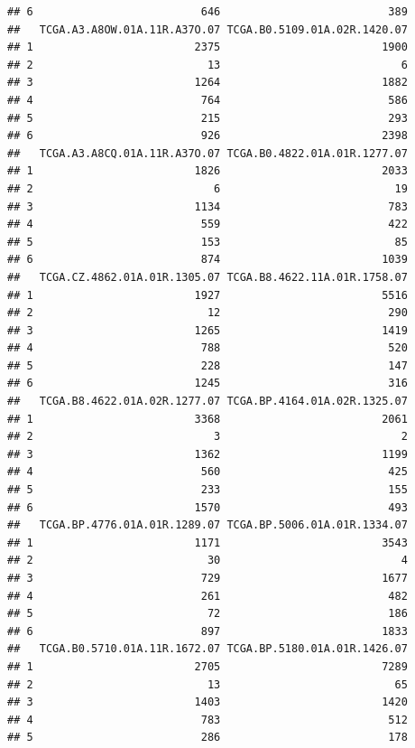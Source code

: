 \documentclass[
]{article}
\begin{document}
\begin{verbatim}
## 6                          646                          389
##   TCGA.A3.A8OW.01A.11R.A37O.07 TCGA.B0.5109.01A.02R.1420.07
## 1                         2375                         1900
## 2                           13                            6
## 3                         1264                         1882
## 4                          764                          586
## 5                          215                          293
## 6                          926                         2398
##   TCGA.A3.A8CQ.01A.11R.A37O.07 TCGA.B0.4822.01A.01R.1277.07
## 1                         1826                         2033
## 2                            6                           19
## 3                         1134                          783
## 4                          559                          422
## 5                          153                           85
## 6                          874                         1039
##   TCGA.CZ.4862.01A.01R.1305.07 TCGA.B8.4622.11A.01R.1758.07
## 1                         1927                         5516
## 2                           12                          290
## 3                         1265                         1419
## 4                          788                          520
## 5                          228                          147
## 6                         1245                          316
##   TCGA.B8.4622.01A.02R.1277.07 TCGA.BP.4164.01A.02R.1325.07
## 1                         3368                         2061
## 2                            3                            2
## 3                         1362                         1199
## 4                          560                          425
## 5                          233                          155
## 6                         1570                          493
##   TCGA.BP.4776.01A.01R.1289.07 TCGA.BP.5006.01A.01R.1334.07
## 1                         1171                         3543
## 2                           30                            4
## 3                          729                         1677
## 4                          261                          482
## 5                           72                          186
## 6                          897                         1833
##   TCGA.B0.5710.01A.11R.1672.07 TCGA.BP.5180.01A.01R.1426.07
## 1                         2705                         7289
## 2                           13                           65
## 3                         1403                         1420
## 4                          783                          512
## 5                          286                          178

\end{verbatim}
\end{document}
